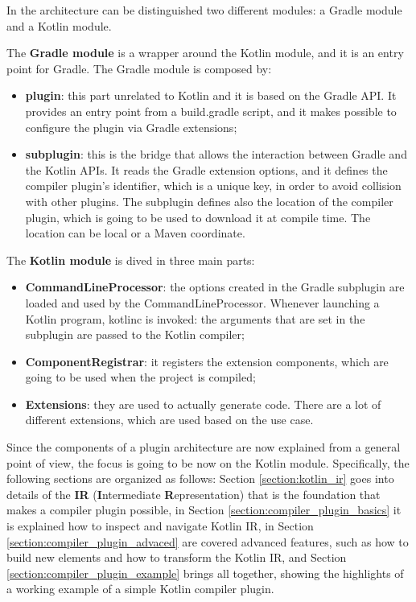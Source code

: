 In the architecture can be distinguished two different modules: a Gradle module and a Kotlin module.

The \textbf{Gradle module} is a wrapper around the Kotlin module, and it is an entry point for Gradle. The Gradle module is composed by:
\begin{itemize}
    \item \textbf{plugin}: this part unrelated to Kotlin and it is based on the Gradle API. It provides an entry point from a build.gradle script, and it makes possible to configure the plugin via Gradle extensions;
    \item \textbf{subplugin}: this is the bridge that allows the interaction between Gradle and the Kotlin APIs. It reads the Gradle extension options, and it defines the compiler plugin's identifier, which is a unique key, in order to avoid collision with other plugins. The subplugin defines also the location of the compiler plugin, which is going to be used to download it at compile time. The location can be local or a Maven coordinate.
\end{itemize}

The \textbf{Kotlin module} is dived in three main parts:
\begin{itemize}
    \item \textbf{CommandLineProcessor}: the options created in the Gradle subplugin are loaded and used by the CommandLineProcessor. Whenever launching a Kotlin program, kotlinc is invoked: the arguments that are set in the subplugin are passed to the Kotlin compiler;
    \item \textbf{ComponentRegistrar}: it registers the extension components, which are going to be used when the project is compiled;
    \item \textbf{Extensions}: they are used to actually generate code. There are a lot of different extensions, which are used based on the use case.
\end{itemize}

Since the components of a plugin architecture are now explained from a general point of view, the focus is going to be now on the Kotlin module.
Specifically, the following sections are organized as follows: Section \ref{section:kotlin_ir} goes into details of the \textbf{IR} (\textbf{I}ntermediate \textbf{R}epresentation) that is the foundation that makes a compiler plugin possible, in Section \ref{section:compiler_plugin_basics} it is explained how to inspect and navigate Kotlin IR, in Section \ref{section:compiler_plugin_advaced} are covered advanced features, such as how to build new elements and how to transform the Kotlin IR, and Section \ref{section:compiler_plugin_example} brings all together, showing the highlights of a working example of a simple Kotlin compiler plugin.

